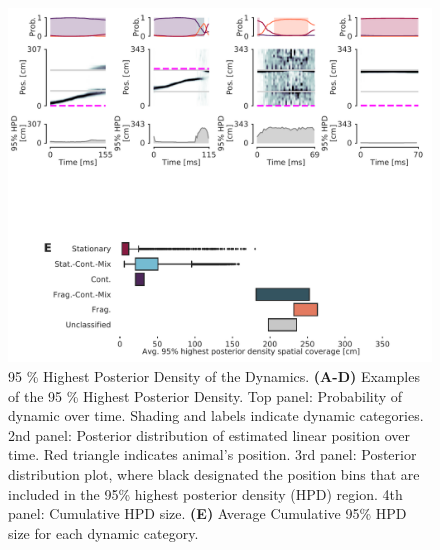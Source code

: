 \documentclass[times, twoside]{zHenriquesLab-StyleBioRxiv}
\begin{document}
\begin{figure}%
\centering
\includegraphics[width=0.80\linewidth]{figures/Figure4/Figure4_v6}
\caption{95 \% Highest Posterior Density of the Dynamics. \textbf{(A-D)}  Examples of the 95 \% Highest Posterior Density. Top panel: Probability of dynamic over time. Shading and labels indicate dynamic categories. 2nd panel: Posterior distribution of estimated linear position over time. Red triangle indicates animal's position. 3rd panel: Posterior distribution plot, where black designated the position bins that are included in the 95\% highest posterior density (HPD) region. 4th panel: Cumulative HPD size. \textbf{(E)} Average Cumulative 95\% HPD size for each dynamic category.}
\label{4}
\end{figure}
\end{document}
